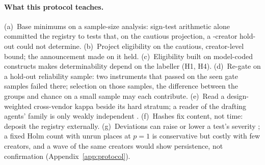 \paragraph{What this protocol teaches.} (a)~Base minimums on a sample-size
analysis: sign-test arithmetic alone committed the registry to tests that, on the cautious projection, a
\NHoldout-creator hold-out could not determine. (b)~Project eligibility on the cautious, creator-level bound; the
announcement made on it held. (c)~Eligibility built on model-coded constructs makes determinability depend on the
labeller (H1, H4). (d)~Re-gate on a hold-out reliability sample: two instruments that passed on the seen gate samples
failed there; selection on those samples, the difference between the groups and chance on a small sample may each
contribute. (e)~Read a design-weighted cross-vendor kappa beside its hard stratum; a reader of the drafting agents'
family is only weakly independent \cite{kim2025correlated}. (f)~Hashes fix content, not time: deposit the registry
externally. (g)~Deviations can raise or lower a test's severity \cite{lakens2024when}; a fixed Holm count with unrun
places at $p = 1$ is conservative but costly with few creators, and a wave of the same creators would show
persistence, not confirmation (Appendix~\ref{app:protocol}).

